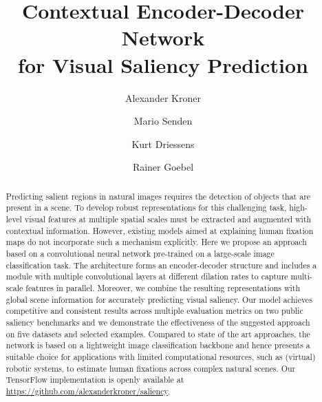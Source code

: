\documentclass[final,1p,times,number]{elsarticle}
\begin{document}
\begin{frontmatter}

\vspace*{-1cm}

\title{Contextual Encoder-Decoder Network \\ for Visual Saliency Prediction}

\author[add1,add2]{Alexander Kroner}
\author[add1,add2]{Mario Senden}
\author[add3]{Kurt Driessens}
\author[add1,add2,add4]{Rainer Goebel}

\address[add1]{Department of Cognitive Neuroscience, Faculty of Psychology and Neuroscience, \\ Maastricht University, Maastricht, The Netherlands}
\address[add2]{Maastricht Brain Imaging Centre, Faculty of Psychology and Neuroscience, \\ Maastricht University, Maastricht, The Netherlands}
\address[add3]{Department of Data Science and Knowledge Engineering, Faculty of Science and Engineering, \\ Maastricht University, Maastricht, The Netherlands}
\address[add4]{Department of Neuroimaging and Neuromodeling, Netherlands Institute for Neuroscience, \\ Royal Netherlands Academy of Arts and Sciences (KNAW), Amsterdam, The Netherlands}


\begin{abstract}
Predicting salient regions in natural images requires the detection of objects that are present in a scene. To develop robust representations for this challenging task, high-level visual features at multiple spatial scales must be extracted and augmented with contextual information. However, existing models aimed at explaining human fixation maps do not incorporate such a mechanism explicitly. Here we propose an approach based on a convolutional neural network pre-trained on a large-scale image classification task. The architecture forms an encoder-decoder structure and includes a module with multiple convolutional layers at different dilation rates to capture multi-scale features in parallel. Moreover, we combine the resulting representations with global scene information for accurately predicting visual saliency. Our model achieves competitive and consistent results across multiple evaluation metrics on two public saliency benchmarks and we demonstrate the effectiveness of the suggested approach on five datasets and selected examples. Compared to state of the art approaches, the network is based on a lightweight image classification backbone and hence presents a suitable choice for applications with limited computational resources, such as (virtual) robotic systems, to estimate human fixations across complex natural scenes. Our TensorFlow implementation is openly available at \url{https://github.com/alexanderkroner/saliency}.
\end{abstract}

\end{frontmatter}
\end{document}
